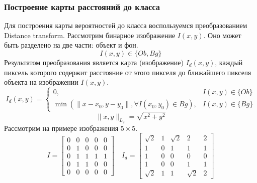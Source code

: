 \subsubsection{Построение карты расстояний до класса}
Для построения карты вероятностей до класса воспользуемся преобразованием Distance transform.
Рассмотрим бинарное изображение $I(x,y)$. Оно может быть разделено на две части: объект и фон.
$$
I(x, y) \in\{O b, B g\}
$$
Результатом преобразования является карта (изображение) $I_{d}(x,y)$, каждый пиксель которого содержит расстояние от этого пикселя до ближайшего пикселя объекта на изображении $I(x,y)$.
$$
I_{d}(x, y)=\left\{\begin{array}{ll}
0, & I(x, y) \in\{O b\} \\
\min \left(\| x-x_{0}, y-y_{0} \|, \forall I\left(x_{0}, y_{0}\right) \in B g\right), & I(x, y) \in\{B g\}
\end{array}\right.
$$
$$
\|x, y\|_{L_{2}}=\sqrt{x^{2}+y^{2}}
$$
Рассмотрим на примере изображения $5 \times 5$.
$$
I = 
\begin{bmatrix}
 0&0&0&0&0 \\
 0&1&0&0&0 \\
 0&1&1&1&1 \\
 0&1&1&0&0 \\
 0&0&0&0&0
\end{bmatrix}
\quad
I_d=
\begin{bmatrix}
 \sqrt{2}&1&\sqrt{2}&2&2 \\
 1&0&1&1&1 \\
 1&0&0&0&0 \\
 1&0&0&1&1 \\
 \sqrt{2}&1&1&\sqrt{2}&2
\end{bmatrix}
$$

